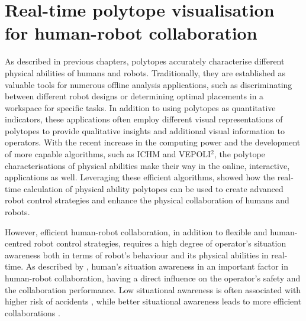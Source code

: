 


\chapter{Real-time polytope visualisation for human-robot collaboration}%
\label{ch:informaiton_polytopes}

As described in previous chapters, polytopes accurately characterise different physical abilities of humans and robots. 
Traditionally, they are established as valuable tools for numerous offline analysis applications, such as discriminating between different robot designs or determining optimal placements in a workspace for specific tasks. 
In addition to using polytopes as quantitative indicators, these applications often employ different visual representations of polytopes to provide qualitative insights and additional visual information to operators. 
With the recent increase in the computing power and the development of more capable algorithms, such as ICHM and VEPOLI$^2$, the polytope characterisations of physical abilities make their way in the online, interactive, applications as well. Leveraging these efficient algorithms,  showed how the real-time calculation of physical ability polytopes can be used to create advanced robot control strategies and enhance the physical collaboration of humans and robots. 

However, efficient human-robot collaboration, in addition to flexible and human-centred robot control strategies, requires a high degree of operator’s situation awareness \cite{Endsley1995sa} both in terms of robot’s behaviour and its physical abilities in real-time. As described by \citet{Camblor2022Signaling}, human's situation awareness in an important factor in human-robot collaboration, having a direct influence on the operator's safety and the collaboration performance. Low situational awareness is often associated with higher risk of accidents \cite{Camblor2022Degraded}, while better situational awareness leads to more efficient collaborations \cite{Camblor2022Signaling}. 

